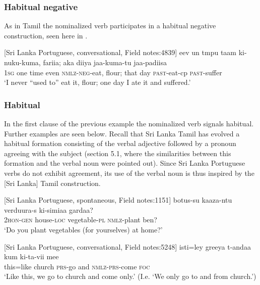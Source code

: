 \subsubsection{Habitual negative }%
As in Tamil the nominalized verb participates in a habitual negative construction, seen here in .
                                            
\ea\label{smith:ex:59}
{}[Sri Lanka Portuguese, conversational, Field notes:4839]
\gll eev un t{\textepsilon}{\textepsilon}mpu taam ki-nuku-kuma, farii{\textltailn}a; aka diiya jaa-kuma-tu jaa-padiisa\\
1\textsc{sg} one time even \textsc{nmlz}-\textsc{neg}-eat, flour; that day \textsc{past}-eat-cp \textsc{past}-suffer\\
`I never ``used to''\footnotemark{} eat it, flour; one day I ate it and suffered.'
\z
{}



\subsubsection{Habitual}%
In the first clause of the previous example the nominalized verb signals habitual. Further examples are seen below. Recall that Sri Lanka Tamil has evolved a habitual formation consisting of the verbal adjective followed by a pronoun agreeing with the subject (section 5.1, where the similarities between this formation and the verbal noun were pointed out). Since Sri Lanka Portuguese verbs do not exhibit agreement, its use of the verbal noun is thus inspired by the [Sri Lanka] Tamil construction. 

\ea\label{smith:ex:60}
{}[Sri Lanka Portuguese, spontaneous, Field notes:1151]
\gll botus-su kaaza-ntu verduura-s ki-simi{\textltailn}aa gardaa? \\
2\textsc{hon}-\textsc{gen} house-\textsc{loc} vegetable-\textsc{pl} \textsc{nmlz}-plant ben?\\
`Do you plant vegetables (for yourselves) at home?'
\z

\ea\label{smith:ex:61}
{}[Sri Lanka Portuguese, conversational, Field notes:5248]
\gll isti=ley greeya t-andaa kum ki-ta-vii mee\\
this=like church \textsc{prs}-go and \textsc{nmlz}-\textsc{prs}-come \textsc{foc}\\
`Like this, we go to church and come only.' (I.e. `We only go to and from church.')
\z


